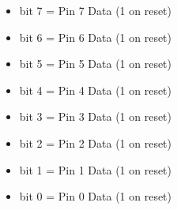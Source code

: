 \begin{itemize}
\item bit 7 = Pin 7 Data (1 on reset)
\item bit 6 = Pin 6 Data (1 on reset)
\item bit 5 = Pin 5 Data (1 on reset)
\item bit 4 = Pin 4 Data (1 on reset)
\item bit 3 = Pin 3 Data (1 on reset)
\item bit 2 = Pin 2 Data (1 on reset)
\item bit 1 = Pin 1 Data (1 on reset)
\item bit 0 = Pin 0 Data (1 on reset)
\end{itemize}

